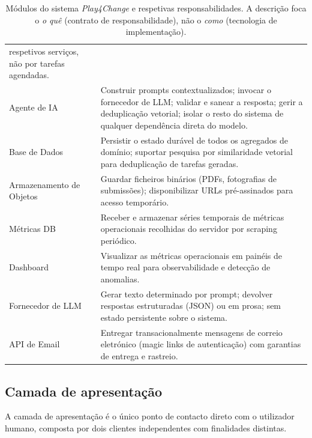 \begin{table}[htbp]
\begin{tabular}{p{3.0cm} p{9.5cm}}
			  respetivos servi\c{c}os, n\~ao por tarefas agendadas. \\
		\addlinespace
		Agente de IA
			& Construir prompts contextualizados; invocar o fornecedor de LLM;
			  validar e sanear a resposta; gerir a deduplica\c{c}\~ao vetorial;
			  isolar o resto do sistema de qualquer depend\^encia direta do modelo. \\
		\addlinespace
		Base de Dados
			& Persistir o estado dur\'avel de todos os agregados de dom\'inio;
			  suportar pesquisa por similaridade vetorial para deduplica\c{c}\~ao de
			  tarefas geradas. \\
		\addlinespace
		Armazenamento de Objetos
			& Guardar ficheiros bin\'arios (PDFs, fotografias de submiss\~oes);
			  disponibilizar URLs pr\'e-assinados para acesso tempor\'ario. \\
		\addlinespace
		M\'etricas DB
			& Receber e armazenar s\'eries temporais de m\'etricas operacionais
			  recolhidas do servidor por scraping peri\'odico. \\
		\addlinespace
		Dashboard
			& Visualizar as m\'etricas operacionais em pain\'eis de tempo real para
			  observabilidade e detec\c{c}\~ao de anomalias. \\
		\addlinespace
		Fornecedor de LLM
			& Gerar texto determinado por prompt; devolver respostas estruturadas
			  (JSON) ou em prosa; sem estado persistente sobre o sistema. \\
		\addlinespace
		API de Email
			& Entregar transacionalmente mensagens de correio eletr\'onico
			  (magic links de autentica\c{c}\~ao) com garantias de entrega e rastreio. \\
		\bottomrule
	\end{tabular}
	\caption[M\'odulos do sistema e respetivas responsabilidades]{M\'odulos do sistema \emph{Play4Change} e respetivas responsabilidades. A descri\c{c}\~ao foca o \emph{o qu\^e} (contrato de responsabilidade), n\~ao o \emph{como} (tecnologia de implementa\c{c}\~ao).}
	\label{tab:modulos-responsabilidades}
\end{table}

\subsection{Camada de apresenta\c{c}\~ao}
\label{ssec:apresentacao}

A camada de apresenta\c{c}\~ao \'e o \'unico ponto de contacto direto com o
utilizador humano, composta por dois clientes independentes com finalidades
distintas.

